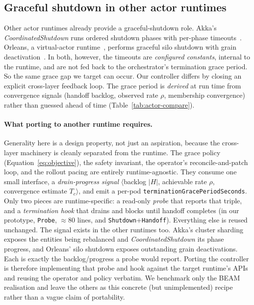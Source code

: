 \documentclass[AMA,Times1COL]{WileyNJDv5}
\begin{document}
\subsection{Graceful shutdown in other actor runtimes}\label{sec:related-actors}

Other actor runtimes already provide a graceful-shutdown role. Akka's
\emph{CoordinatedShutdown} runs ordered shutdown phases with per-phase
timeouts~\cite{akkacoordinated}. Orleans, a virtual-actor runtime~\cite{bernstein2014orleans},
performs graceful silo shutdown with grain deactivation~\cite{orleans}. In both, however, the
timeouts are \emph{configured constants}, internal to the runtime, and are not fed back to the
orchestrator's termination grace period. So the same grace gap we target can occur. Our controller
differs by closing an explicit cross-layer feedback loop. The grace period is \emph{derived} at
run time from convergence signals (handoff backlog, observed rate $\rho$, membership
convergence) rather than guessed ahead of time (Table~\ref{tab:actor-compare}).
\paragraph{What porting to another runtime requires.} Generality here is a design property, not just
an aspiration, because the cross-layer machinery is cleanly separated from the runtime. The grace
policy (Equation~\eqref{eq:objective}), the safety invariant, the operator's reconcile-and-patch loop,
and the rollout pacing are entirely runtime-agnostic. They consume one small interface, a
\emph{drain-progress signal} $\langle$backlog $|H|$, achievable rate $\rho$, convergence
estimate $T_c\rangle$, and emit a per-pod \texttt{terminationGracePeriodSeconds}. Only two pieces are
runtime-specific: a read-only \emph{probe} that reports that triple, and a \emph{termination hook}
that drains and blocks until handoff completes (in our prototype, \texttt{Probe}, $\approx$80 lines,
and \texttt{Shutdown}+\texttt{Handoff}). Everything else is reused unchanged. The signal exists in the
other runtimes too. Akka's cluster sharding exposes the entities being rebalanced and
\emph{CoordinatedShutdown} its phase progress, and Orleans' silo shutdown exposes outstanding grain
deactivations. Each is exactly the backlog/progress a probe would report. Porting the controller is
therefore implementing that probe and hook against the target runtime's APIs and reusing the operator
and policy verbatim. We benchmark only the BEAM realisation and leave the others as this concrete (but
unimplemented) recipe rather than a vague claim of portability.
\end{document}
